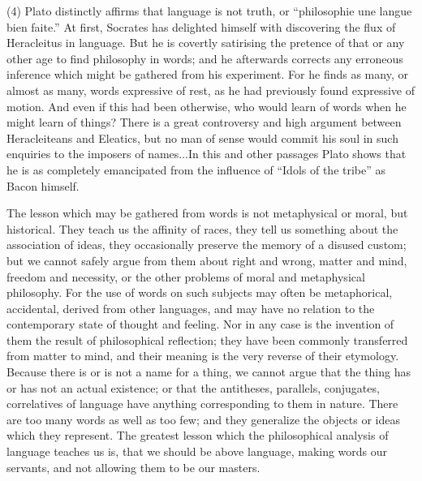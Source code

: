\documentclass[11pt,letter]{article}
\begin{document}
\par  (4) Plato distinctly affirms that language is not truth, or “philosophie une langue bien faite.” At first, Socrates has delighted himself with discovering the flux of Heracleitus in language. But he is covertly satirising the pretence of that or any other age to find philosophy in words; and he afterwards corrects any erroneous inference which might be gathered from his experiment. For he finds as many, or almost as many, words expressive of rest, as he had previously found expressive of motion. And even if this had been otherwise, who would learn of words when he might learn of things? There is a great controversy and high argument between Heracleiteans and Eleatics, but no man of sense would commit his soul in such enquiries to the imposers of names...In this and other passages Plato shows that he is as completely emancipated from the influence of “Idols of the tribe” as Bacon himself.

\par  The lesson which may be gathered from words is not metaphysical or moral, but historical. They teach us the affinity of races, they tell us something about the association of ideas, they occasionally preserve the memory of a disused custom; but we cannot safely argue from them about right and wrong, matter and mind, freedom and necessity, or the other problems of moral and metaphysical philosophy. For the use of words on such subjects may often be metaphorical, accidental, derived from other languages, and may have no relation to the contemporary state of thought and feeling. Nor in any case is the invention of them the result of philosophical reflection; they have been commonly transferred from matter to mind, and their meaning is the very reverse of their etymology. Because there is or is not a name for a thing, we cannot argue that the thing has or has not an actual existence; or that the antitheses, parallels, conjugates, correlatives of language have anything corresponding to them in nature. There are too many words as well as too few; and they generalize the objects or ideas which they represent. The greatest lesson which the philosophical analysis of language teaches us is, that we should be above language, making words our servants, and not allowing them to be our masters.
\end{document}
